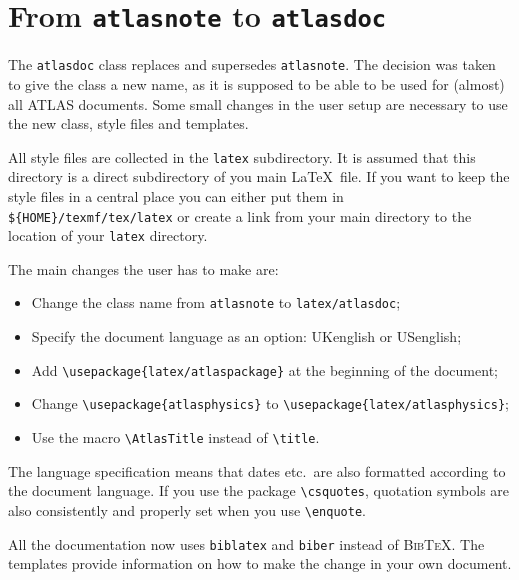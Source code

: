 \documentclass[atlasstyle,UKenglish]{latex/atlasdoc}
\newcommand{\BibTeX}{\textsc{Bib\TeX}}
\newcommand{\Macro}[1]{\texttt{\textbackslash #1}\xspace}
\begin{document}
\section{From \texttt{atlasnote} to \texttt{atlasdoc}}
\label{sec:oldnote}

The \texttt{atlasdoc} class replaces and supersedes \texttt{atlasnote}.
The decision was taken to give the class a new name, as it is supposed to be
able to be used for (almost) all ATLAS documents.
Some small changes in the user setup are necessary to use the new
class, style files and templates.

All style files are collected in the \texttt{latex} subdirectory.
It is assumed that this directory is a direct subdirectory of you main \LaTeX\ file.
If you want to keep the style files in a central place you can either put them in
\verb|${HOME}/texmf/tex/latex| or create a link from your main directory to the location of
your \texttt{latex} directory.

The main changes the user has to make are:
\begin{itemize}
\item Change the class name from \texttt{atlasnote} to \texttt{latex/atlasdoc};
\item Specify the document language as an option: UKenglish or USenglish;
\item Add \verb|\usepackage{latex/atlaspackage}| at the beginning of the document;
\item Change \verb|\usepackage{atlasphysics}| to \verb|\usepackage{latex/atlasphysics}|; 
\item Use the macro \Macro{AtlasTitle} instead of \Macro{title}.
\end{itemize}

The language specification means that dates etc.\ are also formatted according to 
the document language. 
If you use the package \Macro{csquotes}, quotation symbols are also consistently and properly set
when you use \Macro{enquote}.

All the documentation now uses \texttt{biblatex} and \texttt{biber} instead of \BibTeX.
The templates provide information on how to make the change in your own document.
\end{document}
